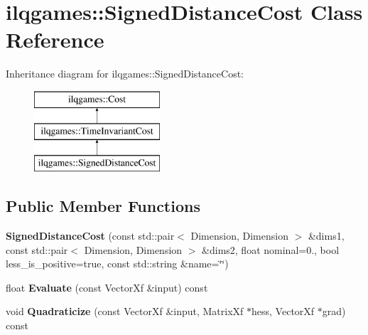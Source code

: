 \hypertarget{classilqgames_1_1_signed_distance_cost}{}\section{ilqgames\+:\+:Signed\+Distance\+Cost Class Reference}
\label{classilqgames_1_1_signed_distance_cost}
Inheritance diagram for ilqgames\+:\+:Signed\+Distance\+Cost\+:\begin{figure}[H]
\begin{center}
\leavevmode
\includegraphics[height=3.000000cm]{classilqgames_1_1_signed_distance_cost}
\end{center}
\end{figure}
\subsection*{Public Member Functions}
\begin{DoxyCompactItemize}
\item 
{\bfseries Signed\+Distance\+Cost} (const std\+::pair$<$ Dimension, Dimension $>$ \&dims1, const std\+::pair$<$ Dimension, Dimension $>$ \&dims2, float nominal=0., bool less\+\_\+is\+\_\+positive=true, const std\+::string \&name=\char`\"{}\char`\"{})\hypertarget{classilqgames_1_1_signed_distance_cost_acaf7384522a5bbb6a282b93ed0c7a096}{}\label{classilqgames_1_1_signed_distance_cost_acaf7384522a5bbb6a282b93ed0c7a096}

\item 
float {\bfseries Evaluate} (const Vector\+Xf \&input) const \hypertarget{classilqgames_1_1_signed_distance_cost_a9694c04cf297f78923eefa0b6d472595}{}\label{classilqgames_1_1_signed_distance_cost_a9694c04cf297f78923eefa0b6d472595}

\item 
void {\bfseries Quadraticize} (const Vector\+Xf \&input, Matrix\+Xf $\ast$hess, Vector\+Xf $\ast$grad) const \hypertarget{classilqgames_1_1_signed_distance_cost_a655aa06d6933385c802895025ab94162}{}\label{classilqgames_1_1_signed_distance_cost_a655aa06d6933385c802895025ab94162}

\end{DoxyCompactItemize}
